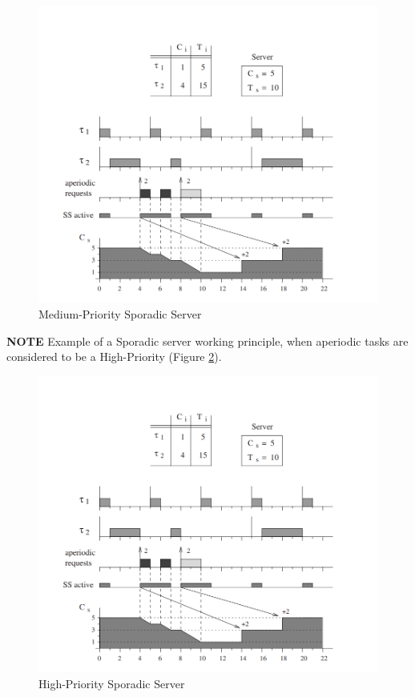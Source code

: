 \documentclass[conference]{IEEEtran}
\begin{document}
\begin{figure}[htbp]
\centerline{\includegraphics[scale=.38]{Example1.png}}
\caption{Medium-Priority Sporadic Server}
\label{example1}
\end{figure}

\textbf{NOTE} Example of a Sporadic server working principle, when aperiodic tasks are considered to be a High-Priority (Figure \ref{example2}).

\begin{figure}[htbp]
\centerline{\includegraphics[scale=.39]{Example1.png}}
\caption{High-Priority Sporadic Server}
\label{example2}
\end{figure}
\end{document}
